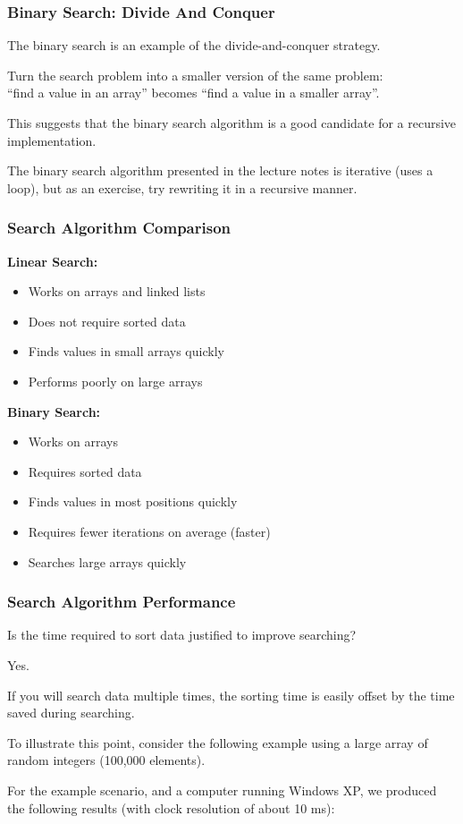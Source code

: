 \begin{frame}
\frametitle{Binary Search: Divide And Conquer}

The binary search is an example of the divide-and-conquer strategy.

Turn the search problem into a smaller version of the same problem: \\
\quad ``find a value in an array'' becomes ``find a value in a smaller array''.

This suggests that the binary search algorithm is a good candidate for a recursive implementation.

The binary search algorithm presented in the lecture notes is iterative (uses a loop), but as an exercise, try rewriting it in a recursive manner.

\end{frame}

\begin{frame}
\frametitle{Search Algorithm Comparison}

\textbf{Linear Search:}
\begin{itemize}
	\item Works on arrays and linked lists
	\item Does not require sorted data
	\item Finds values in small arrays quickly
	\item Performs poorly on large arrays
\end{itemize}


\textbf{Binary Search:}
\begin{itemize}
	\item Works on arrays
	\item Requires sorted data
	\item Finds values in most positions quickly
	\item Requires fewer iterations on average (faster)
	\item Searches large arrays quickly
\end{itemize}

\end{frame}

\begin{frame}
\frametitle{Search Algorithm Performance}
Is the time required to sort data justified to improve searching?

\alert{Yes}. 

If you will search data multiple times, the sorting time is easily offset by the time saved during searching.

To illustrate this point, consider the following example using a large array of random integers (100,000 elements).

For the example scenario, and a computer running Windows XP, we produced the following results (with clock resolution of about 10 ms):

\end{frame}

